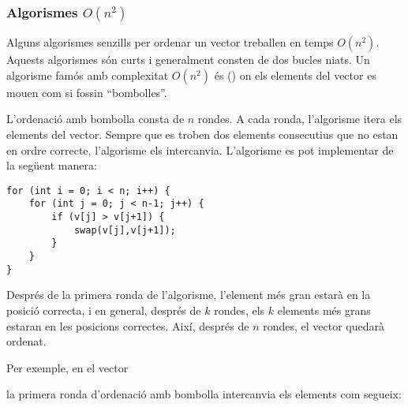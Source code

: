 \subsubsection{Algorismes $O(n^2)$}


Alguns algorismes senzills per ordenar un vector
treballen en temps $O(n^2)$.
Aquests algorismes són curts i generalment
consten de dos bucles niats.
Un algorisme famós amb complexitat $O(n^2)$
és  ()
on els elements del vector es mouen
com si fossin ``bombolles''.

L'ordenació amb bombolla consta de $n$ rondes.
A cada ronda, l'algorisme itera
els elements del vector.
Sempre que es troben dos elements consecutius
que no estan en ordre correcte,
l'algorisme els intercanvia.
L'algorisme es pot implementar de la següent manera:
\begin{lstlisting}
for (int i = 0; i < n; i++) {
    for (int j = 0; j < n-1; j++) {
        if (v[j] > v[j+1]) {
            swap(v[j],v[j+1]);
        }
    }
}
\end{lstlisting}

Després de la primera ronda de l'algorisme,
l'element més gran estarà en la posició correcta,
i en general, després de $k$ rondes, els $k$ elements
més grans estaran en les posicions correctes.
Així, després de $n$ rondes, el vector quedarà
ordenat.

Per exemple, en el vector

\begin{center}
\end{center}

\noindent
la primera ronda d'ordenació amb bombolla intercanvia els
elements com segueix:

\begin{center}
\end{center}

